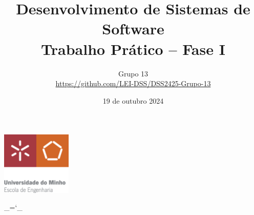 \documentclass[12pt, a4paper]{article}
\title{\textbf{Desenvolvimento de Sistemas de Software \\ \large Trabalho Prático -- Fase I}}
\date{19 de outubro 2024}
\author{
    Grupo 13 \\
    \url{https://github.com/LEI-DSS/DSS2425-Grupo-13}
}
\begin{document}
\begin{center}
    \includegraphics[width=0.25\textwidth]{Imagens/Capa/EE-C.eps}
\end{center}

{\let\newpage\relax\maketitle}
\maketitle
\thispagestyle{empty}

\chardef\_=`_
\onehalfspacing
\setlength{\parskip}{\baselineskip}
\setlength{\parindent}{0pt}
\def\arraystretch{1.5}
\end{document}
